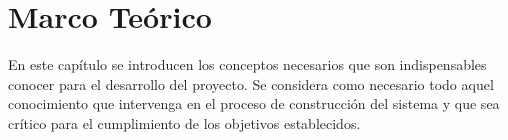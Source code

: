 
\chapter{Marco Teórico} %

\label{MarcoTeorico} %



En este capítulo se introducen los conceptos necesarios que son indispensables conocer para el desarrollo del proyecto. Se considera como necesario todo aquel conocimiento que intervenga en el proceso de construcción del sistema y que sea crítico para el cumplimiento de los objetivos establecidos.







